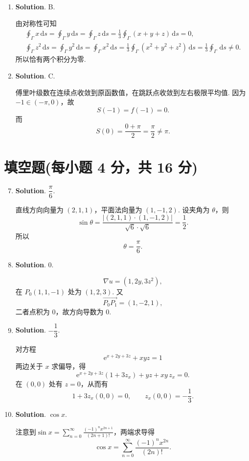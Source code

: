 \documentclass[../main.tex]{subfiles}
\begin{document}
\begin{enumerate}
    \item \textbf{Solution}. B.

          由对称性可知
          \[
              \begin{gathered}
                  \oint_\Gamma x\,\mathrm{d}s=\oint_\Gamma y\,\mathrm{d}s=\oint_\Gamma z\,\mathrm{d}s=\frac{1}{3}\oint_\Gamma (x+y+z)\,\mathrm{d}s=0,\\
                  \oint_\Gamma z^2\,\mathrm{d}s=\oint_\Gamma y^2\,\mathrm{d}s=\oint_\Gamma x^2\,\mathrm{d}s = \frac{1}{3}\oint_\Gamma (x^2+y^2+z^2)\,\mathrm{d}s=\frac{1}{3}\oint_\Gamma \,\mathrm{d}s\neq0.
              \end{gathered}
          \]
          所以恰有两个积分为零.

    \item \textbf{Solution}. C.

          傅里叶级数在连续点收敛到原函数值，在跳跃点收敛到左右极限平均值. 因为 \(-1\in(-\pi,0)\)，故
          \[
              S(-1)=f(-1)=0.
          \]
          而
          \[
              S(0)=\frac{0+\pi}{2}=\frac{\pi}{2}\neq \pi.
          \]

\end{enumerate}

\section{填空题(每小题 4 分，共 16 分)}
\begin{enumerate}
    \setcounter{enumi}{6}
    \item \textbf{Solution}. $\dfrac{\pi}{6}$.

          直线方向向量为 \((2,1,1)\)，平面法向量为 \((1,-1,2)\). 设夹角为 \(\theta\)，则
          \[
              \sin\theta=\frac{|(2,1,1)\cdot(1,-1,2)|}{\sqrt6\cdot\sqrt6}=\frac12.
          \]
          所以
          \[
              \theta=\frac{\pi}{6}.
          \]

    \item \textbf{Solution}. $0$.

          \[
              \nabla u=(1,2y,3z^2),
          \]
          在 \(P_0(1,1,-1)\) 处为 \((1,2,3)\). 又
          \[
              \overrightarrow{P_0P_1}=(1,-2,1),
          \]
          二者点积为 \(0\)，故方向导数为 \(0\).

    \item \textbf{Solution}. $-\dfrac13$.

          对方程
          \[
              \mathrm{e}^{x+2y+3z}+xyz=1
          \]
          两边关于 \(x\) 求偏导，得
          \[
              \mathrm{e}^{x+2y+3z}(1+3z_x)+yz+xy\,z_x=0.
          \]
          在 \((0,0)\) 处有 \(z=0\)，从而有
          \[
              1+3z_x(0,0)=0,\qquad z_x(0,0)=-\frac13.
          \]

    \item \textbf{Solution}. $\cos x$.

          注意到$\sin x = \sum_{n=0}^{\infty} \frac{(-1)^n x^{2n+1}}{(2n+1)!}$，两端求导得
          \[
              \cos x=\sum_{n=0}^{\infty}\frac{(-1)^n x^{2n}}{(2n)!}.
          \]

\end{enumerate}
\end{document}
